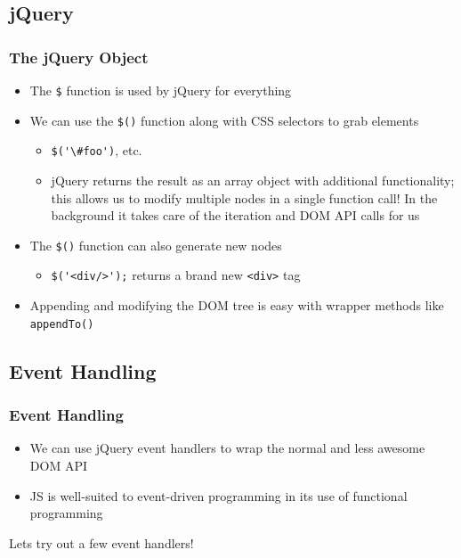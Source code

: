 \documentclass[10pt]{beamer}
\begin{document}
\subsection{jQuery}
\frame
{
  \frametitle{The jQuery Object}

  \begin{itemize}
    \item The \lstinline|$| function is used by jQuery for everything
    \item We can use the \lstinline|$()| function along with CSS selectors to grab elements
      \begin{itemize}
        \item \lstinline|$('\#foo')|, etc.
        \item jQuery returns the result as an array object with additional functionality; this allows us to modify multiple nodes in a single function call! In the background it takes care of the iteration and DOM API calls for us
      \end{itemize}
    \item The \lstinline|$()| function can also generate new nodes
      \begin{itemize}
        \item \lstinline|$('<div/>');| returns a brand new \lstinline|<div>| tag
      \end{itemize}
    \item Appending and modifying the DOM tree is easy with wrapper methods like \lstinline|appendTo()|
  \end{itemize}
}

\subsection{Event Handling}
\frame
{
  \frametitle{Event Handling}

  \begin{itemize}
    \item We can use jQuery event handlers to wrap the normal and less awesome DOM API
    \item JS is well-suited to event-driven programming in its use of functional programming
  \end{itemize}

  Lets try out a few event handlers!
}
\end{document}
